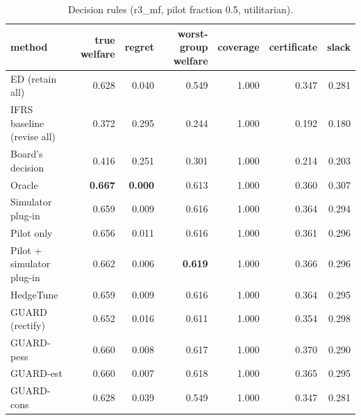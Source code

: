 \begin{table}[t]
\centering
\small
\begin{tabular}{lrrrrrr}
\toprule
method & true welfare & regret & worst-group welfare & coverage & certificate & slack \\
\midrule
ED (retain all) & 0.628 & 0.040 & 0.549 & 1.000 & 0.347 & 0.281 \\
IFRS baseline (revise all) & 0.372 & 0.295 & 0.244 & 1.000 & 0.192 & 0.180 \\
Board's decision & 0.416 & 0.251 & 0.301 & 1.000 & 0.214 & 0.203 \\
Oracle & \textbf{0.667} & \textbf{0.000} & 0.613 & 1.000 & 0.360 & 0.307 \\
Simulator plug-in & 0.659 & 0.009 & 0.616 & 1.000 & 0.364 & 0.294 \\
Pilot only & 0.656 & 0.011 & 0.616 & 1.000 & 0.361 & 0.296 \\
Pilot + simulator plug-in & 0.662 & 0.006 & \textbf{0.619} & 1.000 & 0.366 & 0.296 \\
HedgeTune & 0.659 & 0.009 & 0.616 & 1.000 & 0.364 & 0.295 \\
GUARD (rectify) & 0.652 & 0.016 & 0.611 & 1.000 & 0.354 & 0.298 \\
GUARD-pess & 0.660 & 0.008 & 0.617 & 1.000 & 0.370 & 0.290 \\
GUARD-est & 0.660 & 0.007 & 0.618 & 1.000 & 0.365 & 0.295 \\
GUARD-cons & 0.628 & 0.039 & 0.549 & 1.000 & 0.347 & 0.281 \\
\bottomrule
\end{tabular}
\caption{Decision rules (r3\_mf, pilot fraction 0.5, utilitarian).}
\label{tab:methods-utilitarian}
\end{table}
